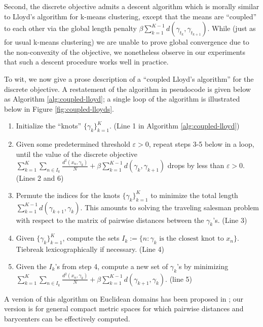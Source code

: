\documentclass[aos, preprint]{imsart}
\theoremstyle{plain}
\theoremstyle{remark}
\begin{document}
Second, the discrete objective admits a descent algorithm which is morally similar to Lloyd's algorithm for k-means clustering, except that the means are ``coupled'' to each other via the global length penalty $\beta\sum_{k=1}^{K-1}d(\gamma_{t_{k}},\gamma_{t_{k+1}})$.  While (just as for usual k-means clustering) we are unable to prove global convergence due to the non-convexity of the objective, we nonetheless observe in our experiments that such a descent procedure works well in practice.

To wit, we now give a prose description of a ``coupled Lloyd's algorithm'' for the discrete objective. A restatement of the algorithm in pseudocode is given below as Algorithm \ref{alg:coupled-lloyd}; a single loop of the algorithm is illustrated below in Figure \ref{fig:coupled-lloyds}.

\begin{enumerate}
\item Initialize the ``knots'' $\{\gamma_{k}\}_{k=1}^{K}$. (Line 1 in Algorithm \ref{alg:coupled-lloyd})
\item Given some predetermined threshold $\varepsilon>0$, repeat steps 3-5 below in a loop, until the value of the discrete objective $\sum_{k=1}^{K}\sum_{n\in
  I_{k}}\frac{d^{2}(x_{n},\gamma_{k})}{N}+\beta\sum_{k=1}^{K-1}d(\gamma_{k},\gamma_{k+1})$ drops by less than
 $\varepsilon>0$. (Lines 2 and 6)
\item Permute the indices for the knots $\{\gamma_{k}\}_{k=1}^{K}$ to
minimize the total length $\sum_{k=1}^{K-1}d(\gamma_{k+1},\gamma_{k})$. This amounts to solving the traveling salesman problem with respect to the matrix of pairwise distances between the $\gamma_k$'s. (Line 3)
\item Given $\{\gamma_{k}\}_{k=1}^{K}$, compute the sets $I_{k}:=\{n:\gamma_{k}\text{ is the closest knot to }x_{n}\}$.
Tiebreak lexicographically if necessary. (Line 4)
\item Given the $I_{k}$'s from step 4, compute a new set of $\gamma_{k}$'s
by minimizing
$\sum_{k=1}^{K}\sum_{n\in I_{k}}\frac{d^{2}(x_{n},\gamma_{k})}{N}+\beta\sum_{k=1}^{K-1}d(\gamma_{k+1},\gamma_{k}).$ (line 5)
\end{enumerate}
A version of this algorithm on Euclidean domains has been proposed in \cite{kirov2017multiple}; our version is for general compact metric spaces for which pairwise distances and barycenters can be effectively computed.
\end{document}

